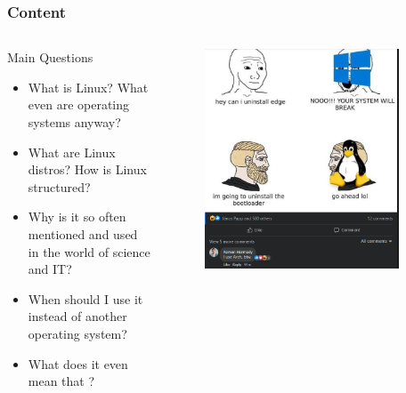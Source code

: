 \begin{frame}
\frametitle{Content}

\begin{columns}
	\begin{block}{Main Questions}
		\begin{itemize}
			\item What is Linux? What even are operating systems anyway?
			\item What are Linux distros? How is Linux structured?
			\item Why is it so often mentioned and used in the world of science and IT?
			\item When should I use it instead of another operating system?
			\item<2> What does it even mean that ?
		\end{itemize}
	\end{block}

	\pause

	\begin{figure}
		\includegraphics[width=0.9\textwidth]{img/archbtw.png}
	\end{figure}
\end{columns}
\end{frame}